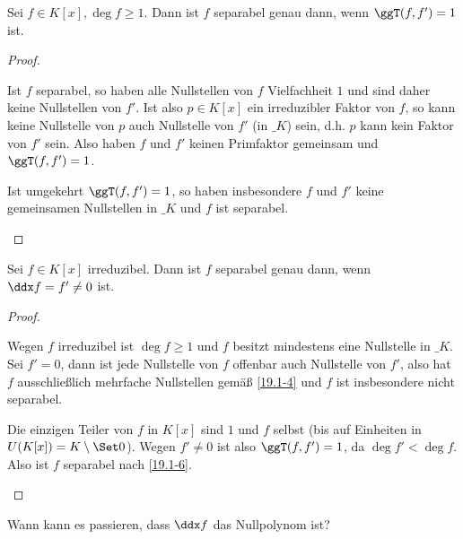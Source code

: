 \begin{kor} \label{dup:19.1-6}
	Sei $f \in K[x], \deg f \ge 1$.
	Dann ist $f$ separabel genau dann, wenn $\ggT(f, f') = 1$ ist.
	\begin{proof}
		\begin{segnb}{\ProofImplication}
			Ist $f$ separabel, so haben alle Nullstellen von $f$ Vielfachheit $1$ und sind daher keine Nullstellen von $f'$.
			Ist also $p \in K[x]$ ein irreduzibler Faktor von $f$, so kann keine Nullstelle von $p$ auch Nullstelle von $f'$ (in $\_K$) sein, d.h. $p$ kann kein Faktor von $f'$ sein.
			Also haben $f$ und $f'$ keinen Primfaktor gemeinsam und $\ggT(f, f') = 1$.
		\end{segnb}
		\begin{segnb}{\ProofImplication*}
			Ist umgekehrt $\ggT(f,f') = 1$, so haben insbesondere $f$ und $f'$ keine gemeinsamen Nullstellen in $\_K$ und $f$ ist separabel.
		\end{segnb}
	\end{proof}
\end{kor}

\begin{kor} \label{19.1-7}
	Sei $f \in K[x]$ irreduzibel.
	Dann ist $f$ separabel genau dann, wenn $\ddx f = f' \neq 0$ ist.
	\begin{proof}
		\begin{segnb}{\ProofImplication}
			Wegen $f$ irreduzibel ist $\deg f \ge 1$ und $f$ besitzt mindestens eine Nullstelle in $\_K$.
			Sei $f' = 0$, dann ist jede Nullstelle von $f$ offenbar auch Nullstelle von $f'$, also hat $f$ ausschließlich mehrfache Nullstellen gemäß \ref{19.1-4} und $f$ ist insbesondere nicht separabel.
		\end{segnb}
		\begin{segnb}{\ProofImplication*}
			Die einzigen Teiler von $f$ in $K[x]$ sind $1$ und $f$ selbst (bis auf Einheiten in $U(K[x]) = K \setminus \Set 0$).
			Wegen $f' \neq 0$ ist also $\ggT(f, f') = 1$, da $\deg f' < \deg f$.
			Also ist $f$ separabel nach \ref{19.1-6}.
		\end{segnb}
	\end{proof}
\end{kor}

Wann kann es passieren, dass $\ddx f$ das Nullpolynom ist?

